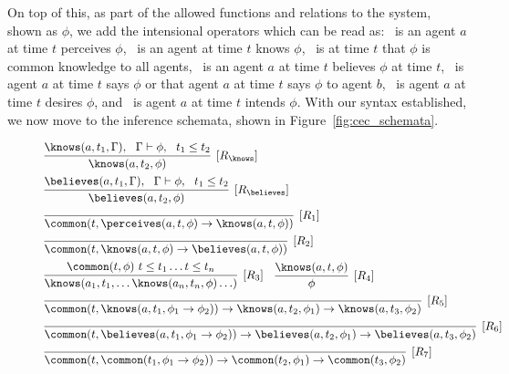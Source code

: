 On top of this, as part of the allowed functions and relations to the system,
shown as $\mathit{\phi}$, we add the intensional operators which can be read as:
\perceives\ is an agent $a$ at time $t$ perceives $\mathit{\phi}$, \knows\
is an agent at time $t$ knows $\mathit{\phi}$, \common\ is at time $t$ that
$\mathit{\phi}$ is common knowledge to all agents, \believes\ is
an agent $a$ at time $t$ believes $\mathit{\phi}$ at time $t$, \says\ is
agent $a$ at time $t$ says $\mathit{\phi}$ or that agent $a$ at time $t$
says $\mathit{\phi}$ to agent $b$, \desires\ is agent $a$ at time $t$ desires
$\mathit{\phi}$, and \intends\ is agent $a$ at time $t$ intends $\mathit{\phi}$.
With our syntax established, we now move to the inference schemata, shown in
Figure~\ref{fig:cec_schemata}.

\begin{figure}[h]
\begin{mdframed}[nobreak=true, roundcorner=8pt, frametitlealignment=\centering]
\begin{equation*}
\begin{aligned}
  &\infer[{[R_{\knows}]}]{\knows(a,t_2,\phi)}{\knows(a,t_1,\Gamma), \ 
    \ \Gamma\vdash\phi, \ \ t_1 \leq t_2} \\ 
& \infer[{[R_{\believes}]}]{\believes(a,t_2,\phi)}{\believes(a,t_1,\Gamma), \ 
    \ \Gamma\vdash\phi, \ \ t_1 \leq t_2} \\
& \infer[{[R_1]}]{\common(t,\perceives(a,t,\phi) \lif\knows(a,t,\phi))}{}\\
&  \infer[{[R_2]}]{\common(t,\knows(a,t,\phi)
    \lif\believes(a,t,\phi))}{}\\
  &\infer[{[R_3]}]{\knows(a_1, t_1, \ldots
    \knows(a_n,t_n,\phi)\ldots)}{\common(t,\phi) \ t\leq t_1 \ldots t\leq
    t_n}\hspace{10pt}
  \infer[{[R_4]}]{\phi}{\knows(a,t,\phi)}\\
  & \infer[{[R_5]}]{\common(t,\knows(a,t_1,\phi_1\lif\phi_2))
    \lif \knows(a,t_2,\phi_1) \lif \knows(a,t_3,\phi_2)}{}\\
& \infer[{[R_6]}]{\common(t,\believes(a,t_1,\phi_1\lif\phi_2))
    \lif \believes(a,t_2,\phi_1) \lif \believes(a,t_3,\phi_2)}{}\\
& \infer[{[R_7]}]{\common(t,\common(t_1,\phi_1\lif\phi_2))
    \lif \common(t_2,\phi_1) \lif \common(t_3,\phi_2)}{} \\

\end{aligned}
\end{equation*}
\end{mdframed}
\end{figure}
